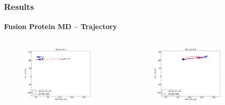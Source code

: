 \documentclass[english]{beamer}
\begin{document}

\begin{frame}
    \frametitle{Results}
    \framesubtitle{Fusion Protein MD -- Trajectory}  

    \vspace{0.06\topmargin}

    \begin{columns}[t]
        \vspace{-4ex}
        \begin{figure}
            \includegraphics[width=0.85\textwidth]{figures/Complex_trajectory/collecitve_coords_structure1.pdf}  
        \end{figure}      
        \vspace{-5ex}
        \begin{figure}
            \includegraphics[width=0.85\textwidth]{figures/Complex_trajectory/collecitve_coords_structure3.pdf}  
        \end{figure}       


\end{columns}
\end{frame}
\end{document}
